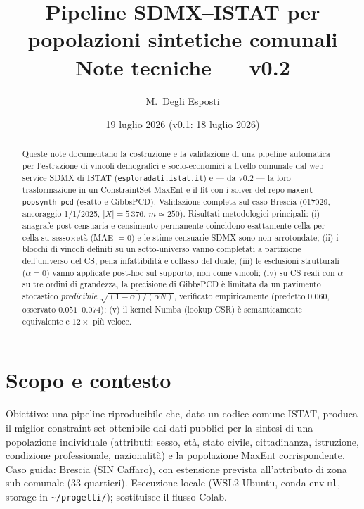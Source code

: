 \documentclass[11pt,a4paper]{article}
\title{\textbf{Pipeline SDMX--ISTAT per popolazioni sintetiche comunali}\\[2mm]
\large Note tecniche --- v0.2}
\author{M.~Degli Esposti}
\date{19 luglio 2026 \quad (v0.1: 18 luglio 2026)}
\newcommand{\code}[1]{\texttt{#1}}
\begin{document}
\maketitle

\begin{abstract}
\noindent
Queste note documentano la costruzione e la validazione di una pipeline automatica
per l'estrazione di vincoli demografici e socio-economici a livello comunale dal
web service SDMX di ISTAT (\code{esploradati.istat.it}) e --- da v0.2 --- la loro
trasformazione in un ConstraintSet MaxEnt e il fit con i solver del repo
\code{maxent-popsynth-pcd} (esatto e GibbsPCD). Validazione completa sul caso
Brescia (017029, ancoraggio 1/1/2025, $|X|=5\,376$, $m\simeq 250$). Risultati
metodologici principali: (i) anagrafe post-censuaria e censimento permanente
coincidono esattamente cella per cella su sesso$\times$et\`a (MAE $=0$) e le
stime censuarie SDMX sono non arrotondate; (ii) i blocchi di vincoli definiti su
un sotto-universo vanno completati a partizione dell'universo del CS, pena
infattibilit\`a e collasso del duale; (iii) le esclusioni strutturali
($\alpha=0$) vanno applicate post-hoc sul supporto, non come vincoli;
(iv) su CS reali con $\alpha$ su tre ordini di grandezza, la precisione di
GibbsPCD \`e limitata da un pavimento stocastico \emph{predicibile}
$\overline{\sqrt{(1-\alpha)/(\alpha N)}}$, verificato empiricamente
(predetto $0.060$, osservato $0.051$--$0.074$); (v) il kernel Numba (lookup
CSR) \`e semanticamente equivalente e $12\times$ pi\`u veloce.
\end{abstract}

\tableofcontents

\section{Scopo e contesto}
Obiettivo: una pipeline riproducibile che, dato un codice comune ISTAT, produca il
miglior constraint set ottenibile dai dati pubblici per la sintesi di una
popolazione individuale (attributi: sesso, et\`a, stato civile,
cittadinanza, istruzione, condizione professionale, nazionalit\`a) e la
popolazione MaxEnt corrispondente. Caso guida: Brescia (SIN Caffaro), con
estensione prevista all'attributo di zona sub-comunale (33 quartieri).
Esecuzione locale (WSL2 Ubuntu, conda env \code{ml}, storage in
\code{\textasciitilde/progetti/}); sostituisce il flusso Colab.

\end{document}
